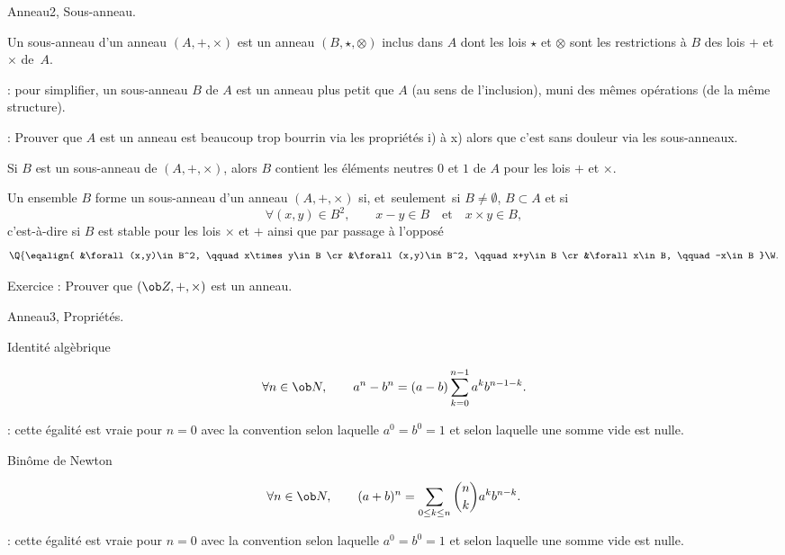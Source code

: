 \Subsection Anneau2, Sous-anneau. 

\Definition [] Un sous-anneau d'un anneau $(A,+,\times)$ est un anneau $(B, \star, \otimes)$ inclus dans $A$ dont les lois
$\star$ et $\otimes$ sont les restrictions \`a $B$ des lois $+$ et $\times$ de~$A$.  \bigskip

\Remarque : pour simplifier, un sous-anneau $B$ de $A$ est un anneau plus petit que $A$ (au sens de l'inclusion), muni des m\^emes op\'erations (de la m\^eme structure). 
\bigskip

\Remarque : Prouver que $A$ est un anneau est beaucoup trop bourrin via les propri\'et\'es i) \`a x) alors que 
c'est sans douleur via les sous-anneaux. 
\bigskip

\Propriete []  Si $B$ est un sous-anneau de $(A,+,\times)$, alors $B$ contient les \'el\'ements neutres $0$ et $1$ de $A$ pour les lois $+$ et $\times$. 
\bigskip

\Propriete []  Un ensemble $B$ forme un sous-anneau d'un anneau $(A,+,\times)$ si, et~seulement~si
$B\neq\emptyset$, $B\subset A$ et si 
$$
\forall (x,y)\in B^2,\qquad x-y\in B\quad\mbox{et}\quad x\times y\in B, 
$$
c'est-\`a-dire si $B$ est stable pour les lois $\times$ et $+$ ainsi que par passage \`a l'oppos\'e
$$
\Q\{
\eqalign{
&\forall (x,y)\in B^2, \qquad x\times y\in B
\cr
&\forall (x,y)\in B^2, \qquad x+y\in B
\cr
&\forall x\in B, \qquad -x\in B
}\W.
$$

Exercice :  Prouver que $(\ob Z, +,\times)$ est un anneau.     
\bigskip

\Subsection Anneau3, Propri\'et\'es. 

\Concept [] Identit\'e alg\`ebrique

\Theoreme [Title=Egalit\'e fondamentale de l'alg\`ebre;$a$ et $b$ \'el\'ements d'un anneau $(A,+,\times)$  v\'erifiant {$ab=ba$}] 
$$
\forall n\in\ob N, \qquad a^n-b^n=(a-b)\sum_{k=0}^{n-1}a^kb^{n-1-k}.
$$

\Remarque : cette \'egalit\'e est vraie pour $n=0$ avec la convention selon laquelle $a^0=b^0=1$ et selon laquelle une somme vide est nulle. 
\bigskip


\Concept [] Bin\^ome de Newton

\Theoreme [Title=Bin\^ome de Newton;$a$ et $b$ \'el\'ements d'un anneau $(A,+,\times)$  v\'erifiant {$ab=ba$}]
$$
\forall n\in\ob N,\qquad (a+b)^n=\sum_{0\le k\le n}{n\choose k}a^kb^{n-k}.
$$

\Remarque : cette \'egalit\'e est vraie pour $n=0$ avec la convention selon laquelle $a^0=b^0=1$ et selon laquelle une somme vide est nulle. 
\bigskip


